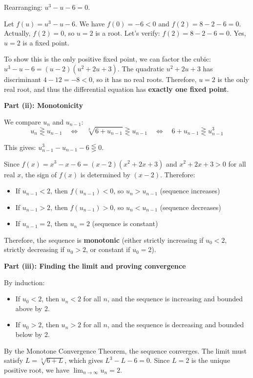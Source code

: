 \documentclass[12pt,a4paper]{article}
\theoremstyle{definition}
\begin{document}
Rearranging: $u^3 - u - 6 = 0$.

Let $f(u) = u^3 - u - 6$. We have $f(0) = -6 < 0$ and $f(2) = 8 - 2 - 6 = 0$. Actually, $f(2) = 0$, so $u = 2$ is a root. Let's verify: $f(2) = 8 - 2 - 6 = 0$. Yes, $u = 2$ is a fixed point.

To show this is the only positive fixed point, we can factor the cubic: $u^3 - u - 6 = (u - 2)(u^2 + 2u + 3)$. The quadratic $u^2 + 2u + 3$ has discriminant $4 - 12 = -8 < 0$, so it has no real roots. Therefore, $u = 2$ is the only real root, and thus the differential equation has \textbf{exactly one fixed point}.

\textbf{Part (ii): Monotonicity}

We compare $u_n$ and $u_{n-1}$:
\[
u_n \gtreqless u_{n-1} \quad \Leftrightarrow \quad \sqrt[3]{6 + u_{n-1}} \gtreqless u_{n-1} \quad \Leftrightarrow \quad 6 + u_{n-1} \gtreqless u_{n-1}^3
\]

This gives: $u_{n-1}^3 - u_{n-1} - 6 \lesseqgtr 0$.

Since $f(x) = x^3 - x - 6 = (x - 2)(x^2 + 2x + 3)$ and $x^2 + 2x + 3 > 0$ for all real $x$, the sign of $f(x)$ is determined by $(x - 2)$. Therefore:
\begin{itemize}
    \item If $u_{n-1} < 2$, then $f(u_{n-1}) < 0$, so $u_n > u_{n-1}$ (sequence increases)
    \item If $u_{n-1} > 2$, then $f(u_{n-1}) > 0$, so $u_n < u_{n-1}$ (sequence decreases)
    \item If $u_{n-1} = 2$, then $u_n = 2$ (sequence is constant)
\end{itemize}

Therefore, the sequence is \textbf{monotonic} (either strictly increasing if $u_0 < 2$, strictly decreasing if $u_0 > 2$, or constant if $u_0 = 2$).

\textbf{Part (iii): Finding the limit and proving convergence}

By induction:
\begin{itemize}
    \item If $u_0 < 2$, then $u_n < 2$ for all $n$, and the sequence is increasing and bounded above by 2.
    \item If $u_0 > 2$, then $u_n > 2$ for all $n$, and the sequence is decreasing and bounded below by 2.
\end{itemize}

By the Monotone Convergence Theorem, the sequence converges. The limit must satisfy $L = \sqrt[3]{6 + L}$, which gives $L^3 - L - 6 = 0$. Since $L = 2$ is the unique positive root, we have $\lim_{n \to \infty} u_n = 2$.
\end{document}
